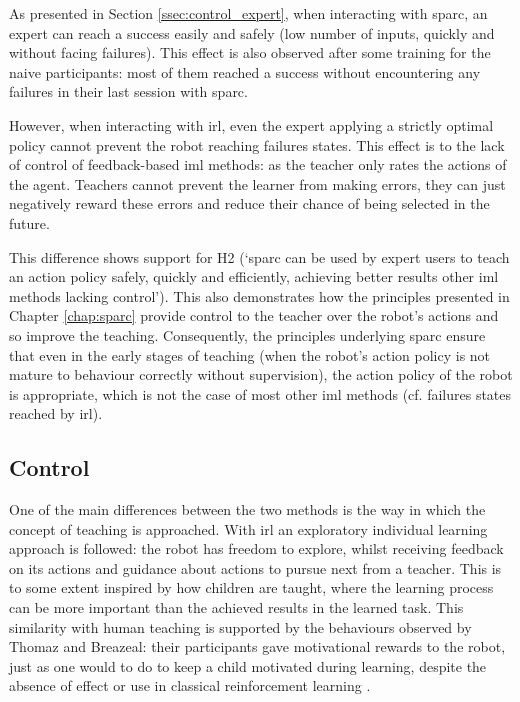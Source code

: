 As presented in Section \ref{ssec:control_expert}, when interacting with \gls{sparc}, an expert can reach a success easily and safely (low number of inputs, quickly and without facing failures). This effect is also observed after some training for the naive participants: most of them reached a success without encountering any failures in their last session with \gls{sparc}.

However, when interacting with \gls{irl}, even the expert applying a strictly optimal policy cannot prevent the robot reaching failures states. This effect is to the lack of control of feedback-based \gls{iml} methods: as the teacher only rates the actions of the agent. Teachers cannot prevent the learner from making errors, they can just negatively reward these errors and reduce their chance of being selected in the future.

This difference shows support for H2 (`\gls{sparc} can be used by expert users to teach an action policy safely, quickly and efficiently, achieving better results other \gls{iml} methods lacking control'). This also demonstrates how the principles presented in Chapter \ref{chap:sparc} provide control to the teacher over the robot's actions and so improve the teaching. Consequently, the principles underlying \gls{sparc} ensure that even in the early stages of teaching (when the robot's action policy is not mature to behaviour correctly without supervision), the action policy of the robot is appropriate, which is not the case of most other \gls{iml} methods (cf. failures states reached by \gls{irl}).

\subsection{Control}
\label{ssec:control_control}

One of the main differences between the two methods is the way in which the concept of teaching is approached. With \gls{irl} an exploratory individual learning approach is followed: the robot has freedom to explore, whilst receiving feedback on its actions and guidance about actions to pursue next from a teacher. This is to some extent inspired by how children are taught, where the learning process can be more important than the achieved results in the learned task. This similarity with human teaching is supported by the behaviours observed by Thomaz and Breazeal: their participants gave motivational rewards to the robot, just as one would to do to keep a child motivated during learning, despite the absence of effect or use in classical reinforcement learning \citep{thomaz2008teachable}.


